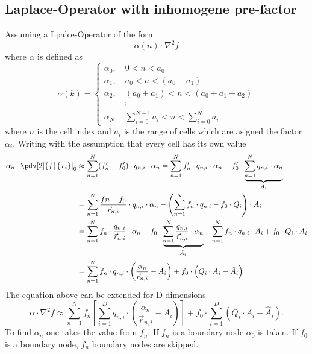 \subsection{Laplace-Operator with inhomogene pre-factor}
Assuming a Lpalce-Operator of the form
\begin{equation}
	\alpha(n) \cdot \nabla^2 f
\end{equation}
where $\alpha$ is defined as
\begin{equation}
	\alpha(k) =
	\begin{cases}
		\alpha_0, & 0 < n < a_0 \\
		\alpha_1, & a_0 < n < (a_0 + a_1) \\
		\alpha_2, & (a_0 + a_1) < n < (a_0 + a_1 + a_2) \\
		& \vdots \\
		\alpha_N, & \sum_{i = 0}^{N - 1} a_i < n < \sum_{i = 0}^{N} a_i
	\end{cases}
\end{equation}
where $n$ is the cell index and $a_i$ is the range of cells which are asigned the factor $\alpha_i$.
Writing with the assumption that every cell has its own value
\begin{align}
	\left. \alpha_n \cdot \pdv[2]{f}{x_i}\right|_0 &\approx \sum_{n = 1}^N (f'_n - f'_0) \cdot q_{n, i} \cdot \alpha_n = \sum_{n = 1}^N f'_n \cdot q_{n, i} \cdot \alpha_n  - f'_0 \cdot \underbrace{\sum_{n = 1}^N q_{n, i} \cdot \alpha_n }_{A_i} \\
  &= \sum_{n = 1}^N \frac{fn - f_0}{\vec{r}_{n, i}} \cdot q_{n, i} \cdot \alpha_n  - \left( \sum_{n = 1}^N f_n \cdot q_{n, i} - f_0 \cdot Q_i \right) \cdot A_i \\
	&= \sum_{n = 1}^N f_n \cdot \frac{q_{n, i}}{\vec{r}_{n, i}} \cdot \alpha_n - f_0 \cdot \underbrace{\sum_{n = 1}^N  \frac{q_{n, i}}{\vec{r}_{n, i}}\cdot \alpha_n }_{\hat{A}_i} - \sum_{n = 1}^N f_n \cdot q_{n, i} \cdot A_i + f_0 \cdot Q_i \cdot A_i \\
	&= \sum_{n = 1}^N f_n \cdot q_{n, i} \cdot \left(\frac{\alpha_n}{\vec{r}_{n, i}} - A_i \right) + f_0 \cdot \left(Q_i \cdot A_i - \hat{A}_i \right)
\end{align}
The equation above can be extended for D dimensions
\begin{equation}
	\alpha \cdot \nabla^2 f \approx \sum_{n = 1}^N f_n \left[ \sum_{i = 1}^D q_{n, i} \cdot \left( \frac{\alpha_n}{\vec{r}_{n, i}} - A_i \right) \right] + f_0 \cdot \sum_{i = 1}^D \left( Q_i \cdot A_i - \hat{A}_i \right).
\end{equation}
To find $\alpha_n$ one takes the value from $f_n$. If $f_n$ is a boundary node $\alpha_0$ is taken. If $f_0$ is a boundary node, $f_n$ boundary nodes are skipped.

